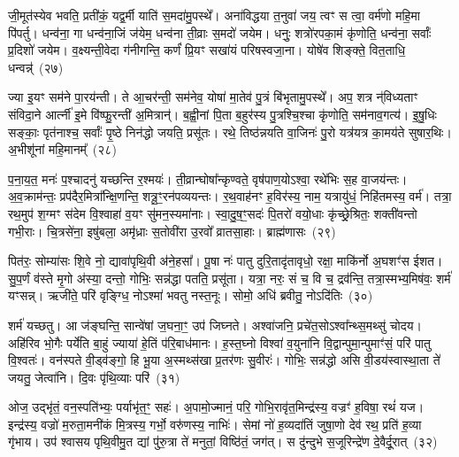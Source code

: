 {\anuvakamend[{अ॒गा॒ꣳ स॒ह॒स्रा॒क्ष॒ दे॒वाः॒ स॒हस्र॑धारा॒मत्यꣳ॑हा॒ अनु॑वर्त्मानः॒ षोड॑श च}]}%

जी॒मूत॑स्येव भवति॒ प्रती॑कं॒ यद्व॒र्मी याति॑ स॒मदा॑मु॒पस्थे᳚। अना॑विद्धया त॒नुवा॑ जय॒ त्वꣳ स त्वा॒ वर्म॑णो महि॒मा पि॑पर्तु। धन्व॑ना॒ गा धन्व॑ना॒जिं ज॑येम॒ धन्व॑ना ती॒व्राः स॒मदो॑ जयेम। धनुः॒ शत्रो॑रपका॒मं कृ॑णोति॒ धन्व॑ना॒ सर्वाः᳚ प्र॒दिशो॑ जयेम। व॒क्ष्यन्ती॒वेदा ग॑नीगन्ति॒ कर्णं॑ प्रि॒यꣳ सखा॑यं परिषस्वजा॒ना। योषे॑व शिङ्क्ते॒ वित॒ताधि॒ धन्वन्न्॑~(२७)

ज्या इ॒यꣳ सम॑ने पा॒रय॑न्ती। ते आ॒चर॑न्ती॒ सम॑नेव॒ योषा॑ मा॒तेव॑ पु॒त्रं बि॑भृतामु॒पस्थे᳚। अप॒ शत्र न्॑विध्यताꣳ संविदा॒ने आर्त्नी॑ इ॒मे वि॑ष्फु॒रन्ती॑ अ॒मित्रान्॑। ब॒ह्वी॒नां पि॒ता ब॒हुर॑स्य पु॒त्रश्चि॒श्चा कृ॑णोति॒ सम॑नाव॒गत्य॑। इ॒षु॒धिः सङ्काः॒ पृत॑नाश्च॒ सर्वाः᳚ पृ॒ष्ठे निन॑द्धो जयति॒ प्रसू॑तः। रथे॒ तिष्ठ॑न्नयति वा॒जिनः॑ पु॒रो यत्र॑यत्र का॒मय॑ते सुषार॒थिः। अ॒भीशू॑नां महि॒मानम्᳚~(२८)

प॒ना॒य॒त॒ मनः॑ प॒श्चादनु॑ यच्छन्ति र॒श्मयः॑। ती॒व्रान्घोषा᳚न्कृण्वते॒ वृष॑पाण॒यो\-ऽश्वा॒ रथे॑भिः स॒ह वा॒जय॑न्तः। अ॒व॒क्राम॑न्तः॒ प्रप॑दैर॒मित्रा᳚न्क्षि॒णन्ति॒ शत्रू॒ꣳ॒रन॑पव्ययन्तः। र॒थ॒वाह॑नꣳ ह॒विर॑स्य॒ नाम॒ यत्रायु॑धं॒ निहि॑तमस्य॒ वर्म॑। तत्रा॒ रथ॒मुप॑ श॒ग्मꣳ स॑देम वि॒श्वाहा॑ व॒यꣳ सु॑मन॒स्यमा॑नाः। स्वा॒दु॒ष॒ꣳ॒सदः॑ पि॒तरो॑ वयो॒धाः कृ॑च्छ्रे॒श्रितः॒ शक्ती॑वन्तो गभी॒राः। चि॒त्रसे॑ना॒ इषु॑बला॒ अमृ॑ध्राः स॒तोवी॑रा उ॒रवो᳚ व्रातसा॒हाः। ब्राह्म॑णासः~(२९)

पित॑रः॒ सोम्या॑सः शि॒वे नो॒ द्यावा॑\-पृथि॒वी अ॑ने॒हसा᳚। पू॒षा नः॑ पातु दुरि॒तादृ॑तावृधो॒ रक्षा॒ माकि॑र्नो अ॒घशꣳ॑स ईशत। सु॒प॒र्णं व॑स्ते मृ॒गो अ॑स्या॒ दन्तो॒ गोभिः॒ सन्न॑द्धा पतति॒ प्रसू॑ता। यत्रा॒ नरः॒ सं च॒ वि च॒ द्रव॑न्ति॒ तत्रा॒स्मभ्य॒मिष॑वः॒ शर्म॑ यꣳसन्न्। ऋजी॑ते॒ परि॑ वृङ्ग्धि॒ नो\-ऽश्मा॑ भवतु नस्त॒नूः। सोमो॒ अधि॑ ब्रवीतु॒ नो\-ऽदि॑तिः~(३०)

शर्म॑ यच्छतु। आ ज॑ङ्घन्ति॒ सान्वे॑षां ज॒घना॒ꣳ॒ उप॑ जिघ्नते। अश्वा॑जनि॒ प्रचे॑त॒सो\-ऽश्वा᳚न्थ्स॒मथ्सु॑ चोदय। अहि॑रिव भो॒गैः पर्ये॑ति बा॒हुं ज्याया॑ हे॒तिं प॑रि॒बाध॑मानः। ह॒स्त॒घ्नो विश्वा॑ व॒युना॑नि वि॒द्वान्पुमा॒न्पुमाꣳ॑सं॒ परि॑ पातु वि॒श्वतः॑। वन॑स्पते वी॒ड्व॑ङ्गो॒ हि भू॒या अ॒स्मथ्स॑खा प्र॒तर॑णः सु॒वीरः॑। गोभिः॒ सन्न॑द्धो असि वी॒डय॑स्वास्था॒ता ते॑ जयतु॒ जेत्वा॑नि। दि॒वः पृ॑थि॒व्याः परि॑~(३१)

ओज॒ उद्भृ॑तं॒ वन॒स्पति॑भ्यः॒ पर्याभृ॑त॒ꣳ॒ सहः॑। अ॒पामो॒ज्मानं॒ परि॒ गोभि॒रावृ॑त॒मिन्द्र॑स्य॒ वज्रꣳ॑ ह॒विषा॒ रथं॑ यज। इन्द्र॑स्य॒ वज्रो॑ म॒रुता॒मनी॑कं मि॒त्रस्य॒ गर्भो॒ वरु॑णस्य॒ नाभिः॑। सेमां नो॑ ह॒व्यदा॑तिं जुषा॒णो देव॑ रथ॒ प्रति॑ ह॒व्या गृ॑भाय। उप॑ श्वासय पृथि॒वीमु॒त द्यां पु॑रु॒त्रा ते॑ मनुतां॒ विष्ठि॑तं॒ जग॑त्। स दु॑न्दुभे स॒जूरिन्द्रे॑ण दे॒वैर्दू॒रात्~(३२)

